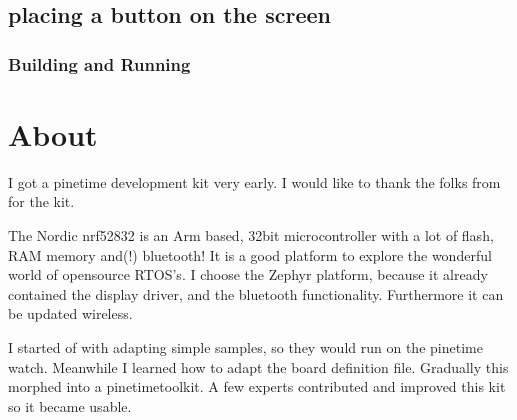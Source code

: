 \documentclass[letterpaper,10pt,english]{sphinxmanual}
\begin{document}
\section{placing a button on the screen}
\label{\detokenize{behind/lvglbutton:placing-a-button-on-the-screen}}\label{\detokenize{behind/lvglbutton::doc}}
\begin{sphinxVerbatim}[commandchars=\\\{\}]
                             
\end{sphinxVerbatim}


\subsection{Building and Running}
\label{\detokenize{behind/lvglbutton:building-and-running}}
\begin{sphinxVerbatim}[commandchars=\\\{\}]

\end{sphinxVerbatim}


\chapter{About}
\label{\detokenize{about:about}}\label{\detokenize{about::doc}}
I got a pinetime development kit very early.
I would like to thank the folks from  for the kit.

The Nordic nrf52832 is an Arm based, 32bit microcontroller with a lot of flash, RAM memory and(!) bluetooth!
It is a good platform to explore the wonderful world of opensource RTOS’s.
I choose the Zephyr platform, because it already contained the display driver, and the bluetooth functionality.
Furthermore it can be updated wireless.

I started of with adapting simple samples, so they would run on the pinetime watch.
Meanwhile I learned how to adapt the board definition file.
Gradually this morphed into a pinetime\sphinxhyphen{}toolkit.
A few experts contributed and improved this kit so it became usable.
\end{document}

